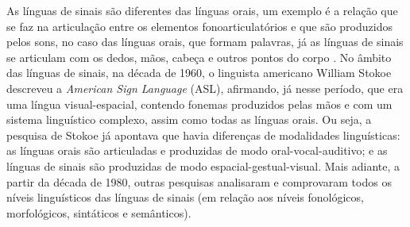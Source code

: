 \documentclass[portuguese]{textolivre}
\begin{document}
As línguas de sinais são diferentes das línguas orais, um exemplo é a relação que se faz na articulação entre os elementos fonoarticulatórios e que são produzidos pelos sons, no caso das línguas orais, que formam palavras, já as línguas de sinais se articulam com os dedos, mãos, cabeça e outros pontos do corpo \cite[p.~11-12]{quadros2025introducao}. No âmbito das línguas de sinais, na década de 1960, o linguista americano William Stokoe descreveu a \textit{American Sign Language} (ASL), afirmando, já nesse período, que era uma língua visual-espacial, contendo fonemas produzidos pelas mãos e com um sistema linguístico complexo, assim como todas as línguas orais. Ou seja, a pesquisa de Stokoe já apontava que havia diferenças de modalidades linguísticas: as línguas orais são articuladas e produzidas de modo oral-vocal-auditivo; e as línguas de sinais são produzidas de modo espacial-gestual-visual. Mais adiante, a partir da década de 1980, outras pesquisas analisaram e comprovaram todos os níveis linguísticos das línguas de sinais (em relação aos níveis fonológicos, morfológicos, sintáticos e semânticos). 
\end{document}
